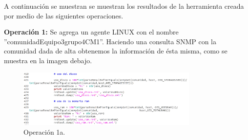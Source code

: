 
\noindent
A continuación se muestran se muestran los resultados de la herramienta creada por medio de las siguientes operaciones.

\noindent
\newline
\textbf{Operación 1:} Se agrega un agente LINUX con el nombre ''comunidadEquipo3grupo4CM1''. Haciendo una consulta SNMP con la comunidad dada de alta obtenemos la información de ésta misma, como se muestra en la imagen debajo.  
 
\begin{figure}[htbp!]
	\centering
		\includegraphics[width=0.8\textwidth]{imagenes/LineaBase/ActualizacionXmlLineaBase.png}
	\caption{Operación 1a.}
\end{figure}